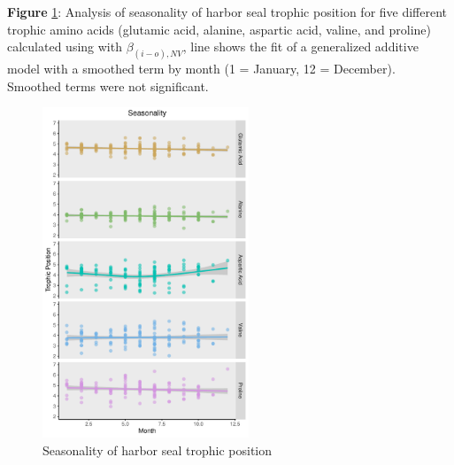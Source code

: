 \documentclass [11pt, proquest] {uwthesis}[2015/03/03]
\begin{document}
\textbf{Figure} \ref{fig:season}: Analysis of seasonality of harbor seal
trophic position for five different trophic amino acids (glutamic acid,
alanine, aspartic acid, valine, and proline) calculated using with
\(\beta_{(i-o),NV}\), line shows the fit of a generalized additive model
with a smoothed term by month (1 = January, 12 = December). Smoothed
terms were not significant. \newline 
\begin{figure}[h]
\centering
  \includegraphics[width=0.55\textwidth]{figure/Ch3/FigureS1.pdf}
  \caption{Seasonality of harbor seal trophic position}
  \label{fig:season}
\end{figure}
\clearpage
\end{document}
